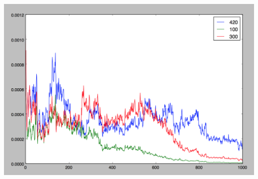 \documentclass[11pt]{article}
\begin{document}
\begin{enumerate}
\includegraphics[scale=.5]{images/p3w.png}

\end{enumerate}
\end{document}
